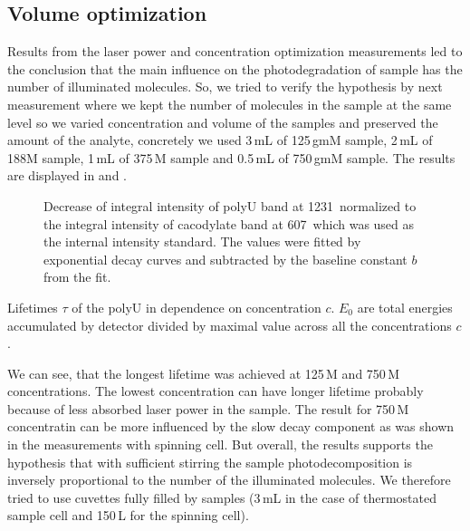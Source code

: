 \subsection{Volume optimization}

Results from the laser power and concentration optimization measurements
led to the conclusion that the main influence on the photodegradation of
sample has the number of illuminated molecules. So, we tried to verify the
hypothesis by next measurement where we kept the number of molecules in the
sample at the same level so we varied concentration and volume of the samples
and preserved the amount of the analyte, concretely we used 3\,mL of
125\,g{m}M sample, 2\,mL of 188M sample, 1\,mL of 375\,M sample and
0.5\,mL of 750\,g{m}M sample. The results are displayed in
and
.

\begin{figure}
	\centering
	
	\caption{Decrease of integral intensity of polyU band at 1231\,\icm{}
		normalized to the integral intensity of cacodylate band at 607\,\icm{}
		which was used as the internal intensity standard. The values were fitted
		by exponential decay curves  and subtracted
		by the baseline constant $b$ from the fit.}
	\label{\figlabel{vol_optim:hairpins}}
\end{figure}

\begin{table}
	\centering
	
	\caption{Lifetimes $\tau$ of the polyU in dependence on concentration
		$c$. $E_0$ are total energies accumulated by detector divided by maximal
		value across all the concentrations $c$.
	}
	\label{\tablabel{vol_optim:lifetimes_hairpins}}
\end{table}

We can see, that the longest lifetime was achieved at 125\,M and
750\,M concentrations. The lowest concentration can have longer lifetime
probably because of less absorbed laser power in the sample. The result for
750\,M concentratin can be more influenced by the slow decay component as
was shown in the measurements with spinning cell. But overall, the results
supports the hypothesis that with sufficient stirring the sample
photodecomposition is inversely proportional to the number of the illuminated
molecules. We therefore tried to use cuvettes fully filled by samples
(3\,mL in the case of thermostated sample cell and 150\,L for the
spinning cell).
